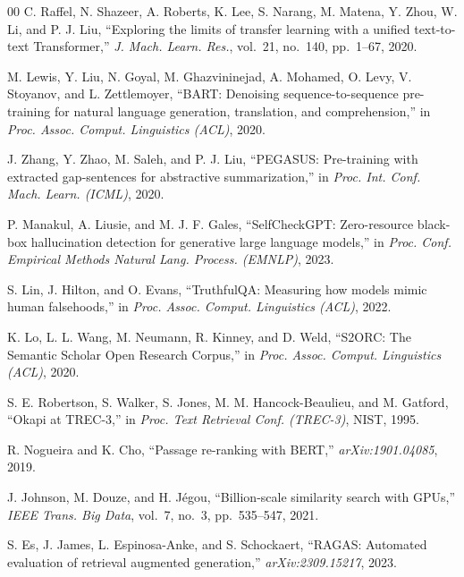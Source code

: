 \documentclass[conference]{IEEEtran}
\begin{document}
\begin{thebibliography}{00}
C. Raffel, N. Shazeer, A. Roberts, K. Lee, S. Narang,
M. Matena, Y. Zhou, W. Li, and P. J. Liu, ``Exploring the
limits of transfer learning with a unified text-to-text
Transformer,'' \textit{J. Mach. Learn. Res.}, vol.~21,
no.~140, pp.~1--67, 2020.

M. Lewis, Y. Liu, N. Goyal, M. Ghazvininejad,
A. Mohamed, O. Levy, V. Stoyanov, and L. Zettlemoyer,
``BART: Denoising sequence-to-sequence pre-training for
natural language generation, translation, and comprehension,''
in \textit{Proc. Assoc. Comput. Linguistics (ACL)}, 2020.

J. Zhang, Y. Zhao, M. Saleh, and P. J. Liu, ``PEGASUS:
Pre-training with extracted gap-sentences for abstractive
summarization,'' in \textit{Proc. Int. Conf. Mach. Learn.
(ICML)}, 2020.

P. Manakul, A. Liusie, and M. J. F. Gales,
``SelfCheckGPT: Zero-resource black-box hallucination detection
for generative large language models,'' in
\textit{Proc. Conf. Empirical Methods Natural Lang. Process.
(EMNLP)}, 2023.

S. Lin, J. Hilton, and O. Evans, ``TruthfulQA: Measuring how
models mimic human falsehoods,'' in
\textit{Proc. Assoc. Comput. Linguistics (ACL)}, 2022.

K. Lo, L. L. Wang, M. Neumann, R. Kinney, and D. Weld,
``S2ORC: The Semantic Scholar Open Research Corpus,'' in
\textit{Proc. Assoc. Comput. Linguistics (ACL)}, 2020.

S. E. Robertson, S. Walker, S. Jones, M. M. Hancock-Beaulieu,
and M. Gatford, ``Okapi at TREC-3,'' in
\textit{Proc. Text Retrieval Conf. (TREC-3)}, NIST, 1995.

R. Nogueira and K. Cho, ``Passage re-ranking with BERT,''
\textit{arXiv:1901.04085}, 2019.

J. Johnson, M. Douze, and H. J\'{e}gou, ``Billion-scale
similarity search with GPUs,'' \textit{IEEE Trans. Big Data},
vol.~7, no.~3, pp.~535--547, 2021.

S. Es, J. James, L. Espinosa-Anke, and S. Schockaert,
``RAGAS: Automated evaluation of retrieval augmented
generation,'' \textit{arXiv:2309.15217}, 2023.

\end{thebibliography}
\end{document}
